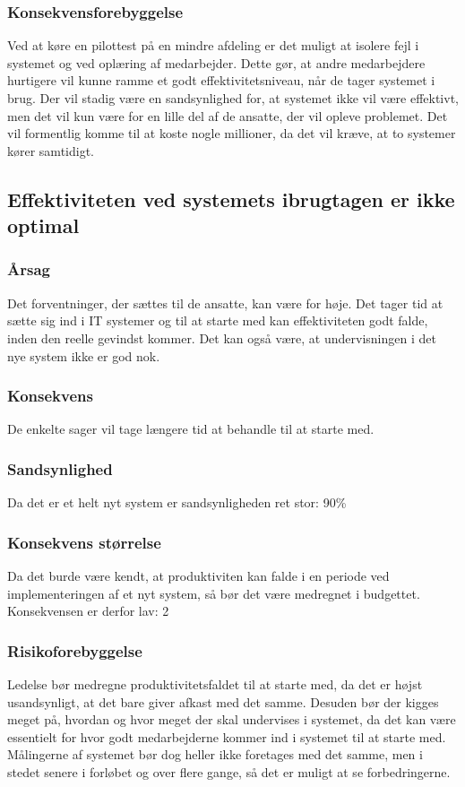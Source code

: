 \documentclass[10pt,a4paper,danish]{article}
\begin{document}
\subsubsection{Konsekvensforebyggelse}
Ved at køre en pilottest på en mindre afdeling er det muligt at isolere fejl i systemet og ved oplæring af medarbejder. 
Dette gør, at andre medarbejdere hurtigere vil kunne ramme et godt effektivitetsniveau, når de tager systemet i brug.
Der vil stadig være en sandsynlighed for, at systemet ikke vil være effektivt, men det vil kun være for en lille del af de ansatte, der vil opleve problemet. Det vil formentlig komme til at koste nogle millioner, da det vil kræve, at to systemer kører samtidigt.

\subsection{Effektiviteten ved systemets ibrugtagen er ikke optimal}
\subsubsection{Årsag}
Det forventninger, der sættes til de ansatte, kan være for høje. Det tager tid at sætte sig ind i IT systemer og til at starte med kan effektiviteten godt falde, inden den reelle gevindst kommer. Det kan også være, at undervisningen i det nye system ikke er god nok.
\subsubsection{Konsekvens}
De enkelte sager vil tage længere tid at behandle til at starte med.
\subsubsection{Sandsynlighed}
Da det er et helt nyt system er sandsynligheden ret stor: 90\%
\subsubsection{Konsekvens størrelse}
Da det burde være kendt, at produktiviten kan falde i en periode ved implementeringen af et nyt system, så bør det være medregnet i budgettet. Konsekvensen er derfor lav: 2
\subsubsection{Risikoforebyggelse}
Ledelse bør medregne produktivitetsfaldet til at starte med, da det er højst usandsynligt, at det bare giver afkast med det samme. Desuden bør der kigges meget på, hvordan og hvor meget der skal undervises i systemet, da det kan være essentielt for hvor godt medarbejderne kommer ind i systemet til at starte med. Målingerne af systemet bør dog heller ikke foretages med det samme, men i stedet senere i forløbet og over flere gange, så det er muligt at se forbedringerne. 
\end{document}

